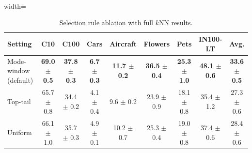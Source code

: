 \begin{table}[H]
\centering
\scriptsize
\setlength{\tabcolsep}{3.5pt}
\caption{Selection rule ablation with full $k$NN results.}
\label{tab:app_selection_knn}
\begin{adjustbox}{width=\textwidth}
\begin{tabular}{l c c c c c c c c}
\toprule
Setting & C10 & C100 & Cars & Aircraft & Flowers & Pets & IN100-LT & Avg. \\
\midrule
Mode-window (default) & \textbf{69.0 {\scriptsize$\pm$ 0.5}} & \textbf{37.8 {\scriptsize$\pm$ 0.3}} & \textbf{6.7 {\scriptsize$\pm$ 0.3}} & \textbf{11.7 {\scriptsize$\pm$ 0.2}} & \textbf{36.5 {\scriptsize$\pm$ 0.4}} & \textbf{25.3 {\scriptsize$\pm$ 1.0}} & \textbf{48.1 {\scriptsize$\pm$ 0.6}} & \textbf{33.6 {\scriptsize$\pm$ 0.5}} \\
Top-tail & 65.7 {\scriptsize$\pm$ 0.8} & 34.4 {\scriptsize$\pm$ 0.2} & 4.1 {\scriptsize$\pm$ 0.4} & 9.6 {\scriptsize$\pm$ 0.2} & 23.9 {\scriptsize$\pm$ 0.9} & 18.1 {\scriptsize$\pm$ 0.8} & 35.4 {\scriptsize$\pm$ 1.2} & 27.3 {\scriptsize$\pm$ 0.6} \\
Uniform & 66.1 {\scriptsize$\pm$ 1.0} & 35.7 {\scriptsize$\pm$ 0.3} & 4.9 {\scriptsize$\pm$ 0.1} & 10.2 {\scriptsize$\pm$ 0.7} & 25.3 {\scriptsize$\pm$ 0.4} & 19.0 {\scriptsize$\pm$ 0.8} & 37.4 {\scriptsize$\pm$ 0.6} & 28.4 {\scriptsize$\pm$ 0.6} \\
\bottomrule
\end{tabular}
\end{adjustbox}
\end{table}
